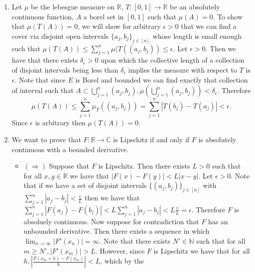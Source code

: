 \documentclass[12pt, letterpaper]{article}
\newcommand{\N}{\mathbb{N}}
\newcommand{\R}{\mathbb{R}}
\newcommand{\C}{\mathbb{C}}
\begin{document}
\begin{enumerate}
\begin{align*}
		\sum_{j=1}^n |F(a_j)G(a_j) - F(b_j)G(b_j)| &= \sum_{j=1}^n |F(a_j)G(a_j) - F(a_j)G(b_j) + F(a_j)G(b_j) - F(b_j)G(b_j)|\\
		&\leq \sum_{j=1}^n |F(a_j)||G(a_j) - G(b_j)| + |G(b_j)||F(a_j) - F(b_j)|\\
		&\leq \sum_{j=1}^n M_F|G(a_j) - G(b_j)| + M_G|F(a_j) - F(b_j)|\\
		&< (M_F + M_G)\epsilon
	\end{align*}
	Therefore $FG$ is absolutely continuous.  
	\item Let $\mu$ be the lebesgue measure on $\R$, $T : [0,1] \to \R$ be an 
	absolutely continuous function, $A$ a borel set in $[0,1]$ 
	such that $\mu(A) = 0$. To show that $\mu(T(A)) = 0$, we will show for arbitrary 
	$\epsilon > 0$ that we can find a cover via disjoint open intervals 
	$\{a_j, b_j\}_{j \in [n]}$ whose 
	length is small enough such that $\mu(T(A)) \leq \sum_{j=1}^n \mu(T((a_j, b_j)) \leq \epsilon$.  Let $\epsilon > 0$.  Then we have that there exists $\delta_\epsilon > 0$ 
	upon which the collective length of a collection of disjoint intervals being less
	than $\delta_\epsilon$ implies the measure with respect to $T$ is $\epsilon$.  Note
	that since $E$ is Borel and bounded we can find exactly that collection of interval such that 
	$A \subset \bigcup_{j=1}^n (a_j, b_j), \mu(\bigcup_{j=1}^n (a_j, b_j)) < \delta_\epsilon$.  Therefore
	$$
	\mu(T(A)) \leq \sum_{j=1}^n \mu_T((a_j,b_j)) = \sum_{j=1}^n |T(b_j) - T(a_j)| < 
	\epsilon.
	$$ 
	Since $\epsilon$ is arbitrary then $\mu(T(A)) = 0$.  
	\item We want to prove that $F:\R \to \C$ is Lipschitz if and only if $F$ is 
	absolutely continuous with a bounded derivative.  
	\begin{itemize}
		\item $(\Rightarrow)$ Suppose that $F$ is Lipschitz.  Then there exists 
		$L > 0$ such that for all $x,y \in \R$ we have that 
		$|F(x) - F(y)| < L |x-y|$.  Let $\epsilon > 0$.  Note that if 
		we have a set of disjoint intervals  $\{(a_j,b_j)\}_{j \in [n]}$ with 
		$\sum_{j=1}^n |a_j - b_j| < \frac{\epsilon}{L}$ then we have that 
		$\sum_{j=1}^n |F(a_j) - F(b_j)| < L \sum_{j=1}^n |a_j - b_j| < L\frac{\epsilon}{L} = \epsilon$. Therefore $F$ is absoluely continuous.  Now suppose for contradiction 
		that $F$ has an unbounded derivative.  Then there exists a sequence in which 
		$\lim_{n \to \infty} |F'(x_n)| = \infty$.  Note that there exists $N' \in \N$ 
		such that for all $m \geq N', |F'(x_m)| > L$.  However, since $F$ is Lipschitz
		we have that for all $h , | \frac{F(x_m + h) - F(x_m)}{h}| < L$, which by the

\end{itemize}
\end{enumerate}
\end{document}
